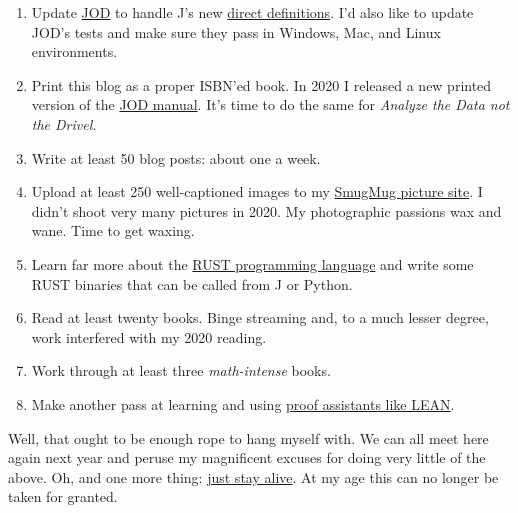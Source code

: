\begin{enumerate}
\def\labelenumi{\arabic{enumi}.}
\tightlist
\item
  Update
  \href{https://analyzethedatanotthedrivel.org/the-jod-page/}{JOD} to
  handle J's new
  \href{https://code.jsoftware.com/wiki/Vocabulary/DirectDefinition}{direct
  definitions}. I'd also like to update JOD's tests and make sure they
  pass in Windows, Mac, and Linux environments.
\item
  Print this blog as a proper ISBN'ed book. In 2020 I released a new
  printed version of the \href{https://www.amazon.com/dp/B08M2KBMND}{JOD
  manual}. It's time to do the same for \emph{Analyze the Data not the
  Drivel.}
\item
  Write at least 50 blog posts: about one a week.
\item
  Upload at least 250 well-captioned images to my
  \href{https://conceptcontrol.smugmug.com/}{SmugMug picture site}. I
  didn't shoot very many pictures in 2020. My photographic passions wax
  and wane. Time to get waxing.
\item
  Learn far more about the \href{https://www.rust-lang.org/}{RUST
  programming language} and write some RUST binaries that can be called
  from J or Python.
\item
  Read at least twenty books. Binge streaming and, to a much lesser
  degree, work interfered with my 2020 reading.
\item
  Work through at least three \emph{math-intense} books.
\item
  Make another pass at learning and using
  \href{https://leanprover.github.io/}{proof assistants like LEAN}.
\end{enumerate}

Well, that ought to be enough rope to hang myself with. We can all meet
here again next year and peruse my magnificent excuses for doing very
little of the above. Oh, and one more thing:
\href{https://www.youtube.com/watch?v=I_izvAbhExY}{just stay alive}. At
my age this can no longer be taken for granted.



%
 

